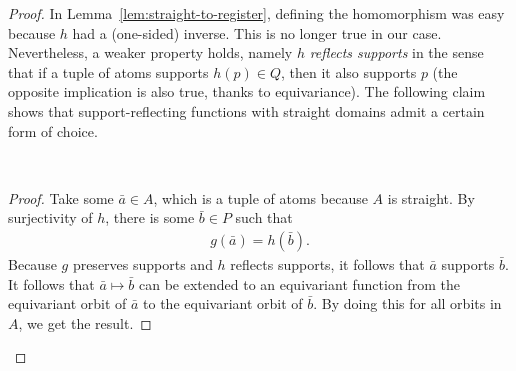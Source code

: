 \begin{proof}
 In Lemma~\ref{lem:straight-to-register}, defining the homomorphism was easy because $h$ had a (one-sided) inverse. This is no longer true in our case. Nevertheless, a weaker property holds, namely $h$ \emph{reflects supports} in the sense that if a tuple of atoms supports $h(p) \in Q$, then it also supports $p$ (the opposite implication is also true, thanks to equivariance). 
The following claim shows that support-reflecting functions with straight domains admit a certain form of choice. 
\begin{claim}\label{claim:reflect-choice} \ 
 \mypic{81} 
\end{claim}
\begin{proof}
 Take some $\bar a \in A$, which is a tuple of atoms because $A$ is straight. 
 By surjectivity of $h$, there is some $\bar b \in P$ such that
 \begin{align*}
 g(\bar a) = h(\bar b).
 \end{align*}
 Because $g$ preserves supports and $h$ reflects supports, it follows that $\bar a$ supports $\bar b$. It follows that $\bar a \mapsto \bar b$ can be extended to an equivariant function from the equivariant orbit of $\bar a$ to the equivariant orbit of $\bar b$. By doing this for all orbits in $A$, we get the result. 
 \end{proof}
 

\end{proof}
